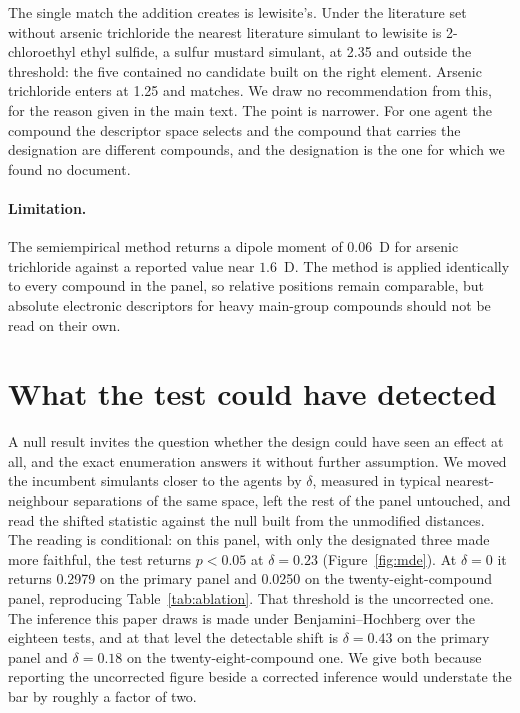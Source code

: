 \documentclass[11pt,a4paper]{article}
\begin{document}
The single match the addition creates is lewisite's. Under the literature set
without arsenic trichloride the nearest literature simulant to lewisite is
2-chloroethyl ethyl sulfide, a sulfur mustard simulant, at 2.35 and outside
the threshold: the five contained no candidate built on the right element.
Arsenic trichloride enters at 1.25 and matches. We draw no recommendation from
this, for the reason given in the main text. The point is narrower. For one
agent the compound the descriptor space selects and the compound that carries
the designation are different compounds, and the designation is the one for
which we found no document.

\paragraph*{Limitation.}
The semiempirical method returns a dipole moment of $0.06$~D for arsenic
trichloride against a reported value near $1.6$~D. The method is applied
identically to every compound in the panel, so relative positions remain
comparable, but absolute electronic descriptors for heavy main-group compounds
should not be read on their own.

\section{What the test could have detected}
\label{res:mde}

A null result invites the question whether the design could have seen an effect
at all, and the exact enumeration answers it without further assumption. We
moved the incumbent simulants closer to the agents by $\delta$, measured in
typical nearest-neighbour separations of the same space, left the rest of the
panel untouched, and read the shifted statistic against the null built from the
unmodified distances. The reading is conditional: on this panel, with only the
designated three made more faithful, the test returns $p<0.05$ at
$\delta = 0.23$ (Figure~\ref{fig:mde}). At $\delta = 0$ it returns 0.2979 on
the primary panel and 0.0250 on the twenty-eight-compound panel, reproducing
Table~\ref{tab:ablation}. That threshold is the uncorrected one. The inference
this paper draws is made under Benjamini--Hochberg over the eighteen tests, and
at that level the detectable shift is $\delta = 0.43$ on the primary panel and
$\delta = 0.18$ on the twenty-eight-compound one. We give both because
reporting the uncorrected figure beside a corrected inference would understate
the bar by roughly a factor of two.
\end{document}
